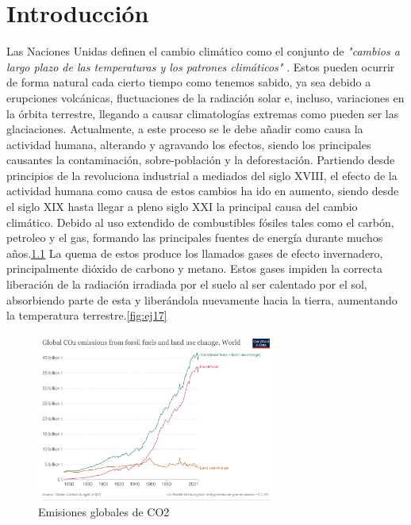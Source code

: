 \chapter[Introducción]{Introducción}
\label{Chap1}

Las Naciones Unidas definen el cambio climático como el conjunto de \textit{"cambios a largo plazo de las temperaturas y los patrones climáticos"} \cite{UNWeb}. Estos pueden ocurrir de forma natural cada cierto tiempo como tenemos sabido, ya sea debido a erupciones volcánicas, fluctuaciones de la radiación solar e, incluso, variaciones en la órbita terrestre, llegando a causar climatologías extremas como pueden ser las glaciaciones. Actualmente, a este proceso se le debe añadir como causa la actividad humana, alterando y agravando los efectos, siendo los principales causantes la contaminación, sobre-población y la deforestación.\newline
\newline
Partiendo desde principios de la revoluciona industrial a mediados del siglo XVIII, el efecto de la actividad humana como causa de estos cambios ha ido en aumento, siendo desde el siglo XIX hasta llegar a pleno siglo XXI la principal causa del cambio climático. Debido al uso extendido de combustibles fósiles tales como el carbón, petroleo y el gas, formando las principales fuentes de energía durante muchos años.\ref{fig:ej16}\newline
\newline
La quema de estos produce los llamados gases de efecto invernadero, principalmente dióxido de carbono y metano. Estos gases impiden la correcta liberación de la radiación irradiada por el suelo al ser calentado por el sol, absorbiendo parte de esta y liberándola nuevamente hacia la tierra, aumentando la temperatura terrestre.\ref{fig:ej17}

\begin{figure} [H]
	\centering
	\includegraphics[width=0.7\textwidth]{fig/global-co2-fossil-plus-land-use.png}
	\caption[Emisiones globales de CO2]{Emisiones globales de CO2 \footnotemark}
	\label{fig:ej16}
\end{figure}


